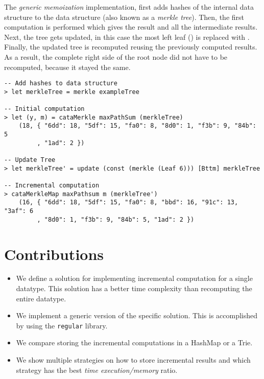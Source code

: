 The \textit{generic memoization} implementation, first adds hashes of the internal data structure to the data structure (also known as a \textit{merkle tree}). Then, the first computation is performed which gives the result and all the intermediate results. Next, the tree gets updated, in this case the most left leaf () is replaced with . Finally, the updated tree is recomputed reusing the previously computed results. As a result, the complete right side of the root node did not have to be recomputed, because it stayed the same.

\begin{verbatim}
-- Add hashes to data structure
> let merkleTree = merkle exampleTree

-- Initial computation
> let (y, m) = cataMerkle maxPathSum (merkleTree)
    (18, { "6dd": 18, "5df": 15, "fa0": 8, "8d0": 1, "f3b": 9, "84b": 5
         , "1ad": 2 })

-- Update Tree
> let merkleTree' = update (const (merkle (Leaf 6))) [Bttm] merkleTree

-- Incremental computation
> cataMerkleMap maxPathsum m (merkleTree')
    (16, { "6dd": 18, "5df": 15, "fa0": 8, "bbd": 16, "91c": 13, "3af": 6
         , "8d0": 1, "f3b": 9, "84b": 5, "1ad": 2 })
\end{verbatim}

\section{Contributions}
\begin{itemize}
    \item We define a solution for implementing incremental computation for a single datatype. This solution has a better time complexity than recomputing the entire datatype.
    \item We implement a generic version of the specific solution. This is accomplished by using the \texttt{regular} library.
    \item We compare storing the incremental computations in a HashMap or a Trie.
    \item We show multiple strategies on how to store incremental results and which strategy has the best \textit{time execution/memory} ratio.
\end{itemize}